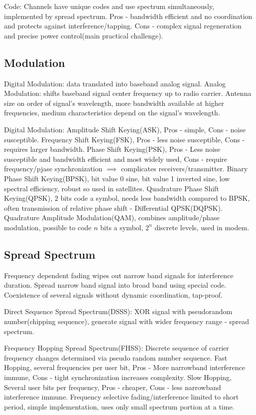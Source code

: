 \documentclass[9pt]{extarticle}
\begin{document}
\begin{multicols}{2}
Code: Channels have unique codes and use spectrum simultaneously, implemented by spread spectrum. Pros - bandwidth efficient and no coordination and protects against interference/tapping. Cons - complex signal regeneration and precise power control(main practical challenge).

\subsection{Modulation}

Digital Modulation: data translated into baseband analog signal. Analog Modulation: shifts baseband signal center frequency up to radio carrier. Antenna size on order of signal’s wavelength, more bandwidth available at higher frequencies, medium characteristics depend on the
signal’s wavelength. 

Digital Modulation: Amplitude Shift Keying(ASK), Pros - simple, Cons - noise susceptible. Frequency Shift Keying(FSK), Pros - less noise susceptible, Cons - requires larger bandwidth. Phase Shift Keying(PSK), Pros - Less noise susceptible and bandwidth efficient and most widely used, Cons - require frequency/pjase synchronization $\implies$ complicates receivers/transmitter. Binary Phase Shift Keying(BPSK), bit value 0 sine, bit value 1 inverted sine, low spectral efficiency, robust so used in satellites. Quadrature Phase Shift Keying(QPSK), 2 bits code a symbol, needs less bandwidth compared to BPSK, often transmission of relative phase shift - Differential QPSK(DQPSK). Quadrature Amplitude Modulation(QAM), combines amplitude/phase modulation, possible to code $n$ bits a symbol, $2^n$ discrete levels, used in modem.

\subsection{Spread Spectrum}

Frequency dependent fading wipes out narrow band signals
for interference duration. Spread narrow band signal into broad band using special code. Coexistence of several signals without dynamic coordination, tap-proof.

Direct Sequence Spread Spectrum(DSSS): XOR signal with pseudorandom number(chipping sequence), generate signal with wider frequency range - spread spectrum.

Frequency Hopping Spread Spectrum(FHSS): Discrete sequence of carrier frequency changes determined via pseudo random number sequence. Fast Hopping, several frequencies per user bit, Pros - More narrowband interference immune, Cons - tight synchronization increases complexity. Slow Hopping, Several user bits per frequency, Pros - cheaper, Cons - less narrowband interference immune. Frequency selective fading/interference limited to short period, simple implementation, uses only small spectrum portion at a time.


\end{multicols}
\end{document}
